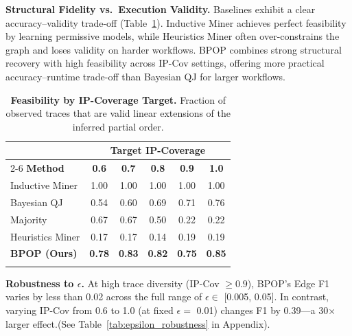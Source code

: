 \documentclass{article}
\theoremstyle{plain}
\theoremstyle{definition}
\theoremstyle{remark}
\begin{document}
\noindent \textbf{Structural Fidelity vs.\ Execution Validity.}
Baselines exhibit a clear accuracy–validity trade-off (Table~\ref{tab:feasibility}).
Inductive Miner achieves perfect feasibility by learning permissive models, while Heuristics Miner often over-constrains the graph and loses validity on harder workflows. BPOP combines strong structural recovery with high feasibility across IP-Cov settings, offering more practical accuracy–runtime trade-off than Bayesian QJ for larger workflows.


\begin{table}[t!]
\centering
\caption{\textbf{Feasibility by IP-Coverage Target.} Fraction of observed traces that are valid linear extensions of the inferred partial order.}
\label{tab:feasibility}
\small
\setlength{\tabcolsep}{6pt}
\begin{tabular}{lccccc}
\toprule
& \multicolumn{5}{c}{\textbf{Target IP-Coverage}} \\
\cmidrule(lr){2-6}
\textbf{Method} & \textbf{0.6} & \textbf{0.7} & \textbf{0.8} & \textbf{0.9} & \textbf{1.0} \\
\midrule
Inductive Miner & 1.00 & 1.00 & 1.00 & 1.00 & 1.00 \\
Bayesian QJ & 0.54 & 0.60 & 0.69 & 0.71 & 0.76 \\
Majority & 0.67 & 0.67 & 0.50 & 0.22 & 0.22 \\
Heuristics Miner & 0.17 & 0.17 & 0.14 & 0.19 & 0.19 \\
\midrule
\textbf{BPOP (Ours)} & \textbf{0.78} & \textbf{0.83} & \textbf{0.82} & \textbf{0.75} & \textbf{0.85} \\
\bottomrule
    \vspace{-10pt} %
\end{tabular}
\end{table}

\noindent \textbf{Robustness to $\epsilon$.}
At high trace diversity (IP-Cov $\ge 0.9$), BPOP's Edge F1 varies by less than 0.02 across the full range of $\epsilon \in$  [0.005, 0.05]. In contrast, varying IP-Cov from 0.6 to 1.0 (at fixed $\epsilon =$  0.01) changes F1 by 0.39—a 30× larger effect.(See Table~\ref{tab:epsilon_robustness} in Appendix).
\end{document}
